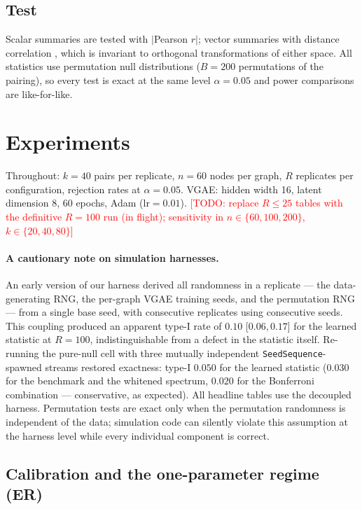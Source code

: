 \documentclass[11pt]{article}
\newcommand{\todo}[1]{\textcolor{red}{[TODO: #1]}}
\begin{document}
\subsection{Test}

Scalar summaries are tested with $|$Pearson $r$$|$; vector summaries with
distance correlation \citep{szekely2007measuring}, which is invariant to
orthogonal transformations of either space. All statistics use permutation
null distributions ($B = 200$ permutations of the pairing), so every test is
exact at the same level $\alpha = 0.05$ and power comparisons are like-for-like.

\section{Experiments}\label{sec:experiments}

Throughout: $k = 40$ pairs per replicate, $n = 60$ nodes per graph, $R$
replicates per configuration, rejection rates at $\alpha = 0.05$. VGAE: hidden
width 16, latent dimension 8, 60 epochs, Adam ($\mathrm{lr} = 0.01$).
\todo{replace $R \le 25$ tables with the definitive $R = 100$ run (in flight);
sensitivity in $n \in \{60, 100, 200\}$, $k \in \{20, 40, 80\}$}

\paragraph{A cautionary note on simulation harnesses.}
An early version of our harness derived all randomness in a replicate --- the
data-generating RNG, the per-graph VGAE training seeds, and the permutation
RNG --- from a single base seed, with consecutive replicates using consecutive
seeds. This coupling produced an apparent type-I rate of $0.10$
\mbox{[$0.06, 0.17$]} for the learned statistic at $R = 100$, indistinguishable
from a defect in the statistic itself. Re-running the pure-null cell with three
mutually independent \texttt{SeedSequence}-spawned streams restored exactness:
type-I $0.050$ for the learned statistic ($0.030$ for the benchmark and the
whitened spectrum, $0.020$ for the Bonferroni combination --- conservative, as
expected). All headline tables use the decoupled harness. Permutation tests
are exact only when the permutation randomness is independent of the data;
simulation code can silently violate this assumption at the harness level
while every individual component is correct.

\subsection{Calibration and the one-parameter regime (ER)}\label{sec:calibration}
\end{document}

